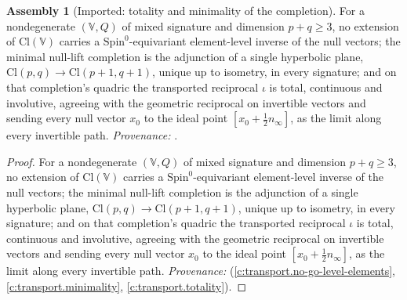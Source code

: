 \documentclass[11pt]{article}
\theoremstyle{definition}
\newtheorem{assembled}[theorem]{Assembly}
\theoremstyle{plain}
\providecommand{\Cl}{}\renewcommand{\Cl}{\mathrm{Cl}}
\begin{document}
\begin{assembled}[Imported: totality and minimality of the completion]\label{c:rungs.imported-totality-minimality-completion}
For a nondegenerate $(\mathbb{V}, Q)$ of mixed signature and dimension $p + q \geq 3$, no extension of $\Cl(\mathbb{V})$ carries a $\mathrm{Spin}^{0}$-equivariant element-level inverse of the null vectors; the minimal null-lift completion is the adjunction of a single hyperbolic plane, $\Cl(p,q) \to \Cl(p{+}1,q{+}1)$, unique up to isometry, in every signature; and on that completion's quadric the transported reciprocal $\iota$ is total, continuous and involutive, agreeing with the geometric reciprocal on invertible vectors and sending every null vector $x_{0}$ to the ideal point $[x_{0} + \tfrac12 n_{\infty}]$, as the limit along every invertible path. \emph{Provenance:} \cite[Thms.~4.2, 4.10, 4.13]{ButlerT1}.
\end{assembled}
\begin{proof}
For a nondegenerate $(\mathbb{V}, Q)$ of mixed signature and dimension $p + q \geq 3$, no extension of $\Cl(\mathbb{V})$ carries a $\mathrm{Spin}^{0}$-equivariant element-level inverse of the null vectors; the minimal null-lift completion is the adjunction of a single hyperbolic plane, $\Cl(p,q) \to \Cl(p{+}1,q{+}1)$, unique up to isometry, in every signature; and on that completion's quadric the transported reciprocal $\iota$ is total, continuous and involutive, agreeing with the geometric reciprocal on invertible vectors and sending every null vector $x_{0}$ to the ideal point $[x_{0} + \tfrac12 n_{\infty}]$, as the limit along every invertible path. \emph{Provenance:} \cite[Thms.~4.2, 4.10, 4.13]{ButlerT1} (\ref{c:transport.no-go-level-elements}, \ref{c:transport.minimality}, \ref{c:transport.totality}).

\end{proof}
\end{document}
